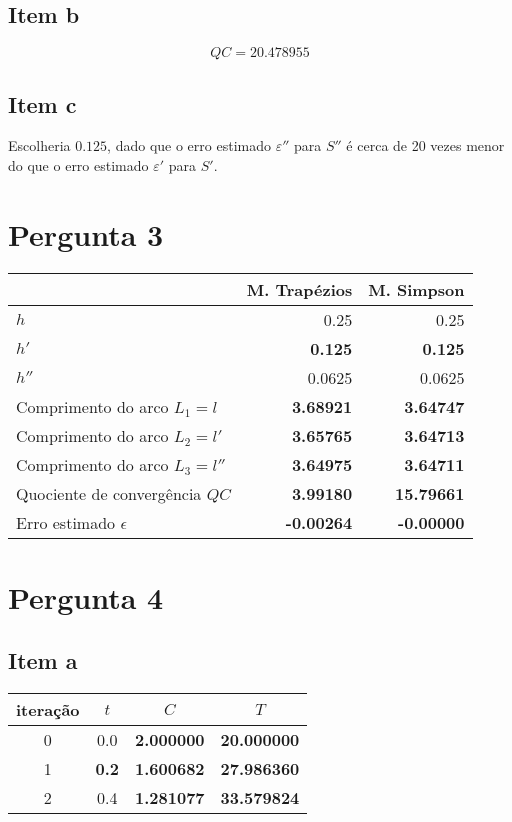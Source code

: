 {\subsection{Item b}
\begin{equation*}
	QC=20.478955
\end{equation*}
\subsection{Item c}
Escolheria $0.125$, dado que o erro estimado $\varepsilon''$ para $S''$ é cerca de 20 vezes menor do que o erro estimado $\varepsilon'$ para $S'$.

\section{Pergunta 3}

\begin{center} \begin{tabular}{l | r r}
	& M. Trapézios & M. Simpson \\ \hline
	$h$ & 0.25 & 0.25 \\
	$h'$ & \textbf{0.125} & \textbf{0.125} \\
	$h''$ & 0.0625 & 0.0625 \\
	Comprimento do arco $L_1=l  $  & \textbf{3.68921} & \textbf{3.64747} \\
	Comprimento do arco $L_2=l' $  & \textbf{3.65765} & \textbf{3.64713} \\
	Comprimento do arco $L_3=l''$  & \textbf{3.64975} & \textbf{3.64711} \\
	Quociente de convergência $QC$ & \textbf{3.99180} & \textbf{15.79661} \\
	Erro estimado $\epsilon$       & \textbf{-0.00264} & \textbf{-0.00000}
\end{tabular} \end{center}

\section{Pergunta 4}

\subsection{Item a}
\begin{center} \begin{tabular}{c | c c c}
	iteração & $t$ & $C$  & $T$ \\ \hline
	0 & 0.0 & \textbf{2.000000} & \textbf{20.000000} \\
	1 & \textbf{0.2} & \textbf{1.600682} & \textbf{27.986360} \\
	2 & 0.4 & \textbf{1.281077} & \textbf{33.579824}
\end{tabular} \end{center}
}
